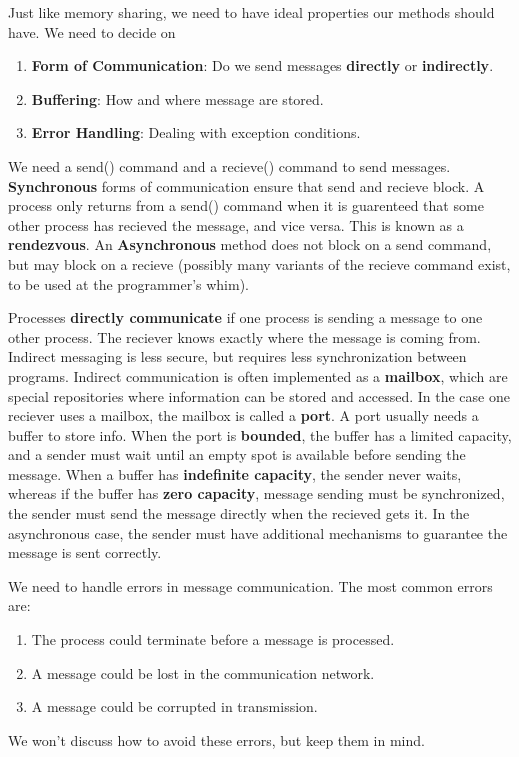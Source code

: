 Just like memory sharing, we need to have ideal properties our methods should have. We need to decide on
%
\begin{enumerate}
    \item {\bf Form of Communication}: Do we send messages {\bf directly} or {\bf indirectly}.
    \item {\bf Buffering}: How and where message are stored.
    \item {\bf Error Handling}: Dealing with exception conditions.
\end{enumerate}
%
We need a send() command and a recieve() command to send messages. {\bf Synchronous} forms of communication ensure that send and recieve block. A process only returns from a send() command when it is guarenteed that some other process has recieved the message, and vice versa. This is known as a {\bf rendezvous}. An {\bf Asynchronous} method does not block on a send command, but may block on a recieve (possibly many variants of the recieve command exist, to be used at the programmer's whim).

Processes {\bf directly communicate} if one process is sending a message to one other process. The reciever knows exactly where the message is coming from. Indirect messaging is less secure, but requires less synchronization between programs. Indirect communication is often implemented as a {\bf mailbox}, which are special repositories where information can be stored and accessed. In the case one reciever uses a mailbox, the mailbox is called a {\bf port}. A port usually needs a buffer to store info. When the port is {\bf bounded}, the buffer has a limited capacity, and a sender must wait until an empty spot is available before sending the message. When a buffer has {\bf indefinite capacity}, the sender never waits, whereas if the buffer has {\bf zero capacity}, message sending must be synchronized, the sender must send the message directly when the recieved gets it. In the asynchronous case, the sender must have additional mechanisms to guarantee the message is sent correctly.

We need to handle errors in message communication. The most common errors are:
%
\begin{enumerate}
    \item The process could terminate before a message is processed.
    \item A message could be lost in the communication network.
    \item A message could be corrupted in transmission.
\end{enumerate}
%
We won't discuss how to avoid these errors, but keep them in mind.

